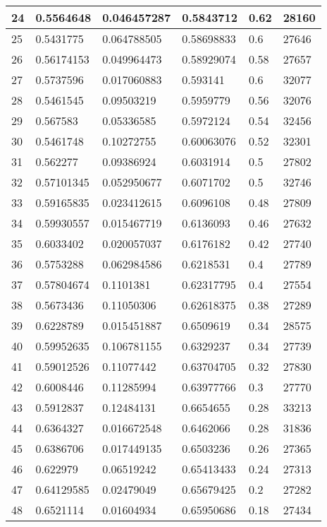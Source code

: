 \begin{longtable}{|l|l|l|l|l|l|}
24 & 0.5564648 & 0.046457287 & 0.5843712 & 0.62 & 28160 \\ \hline 
25 & 0.5431775 & 0.064788505 & 0.58698833 & 0.6 & 27646 \\ \hline 
26 & 0.56174153 & 0.049964473 & 0.58929074 & 0.58 & 27657 \\ \hline 
27 & 0.5737596 & 0.017060883 & 0.593141 & 0.6 & 32077 \\ \hline 
28 & 0.5461545 & 0.09503219 & 0.5959779 & 0.56 & 32076 \\ \hline 
29 & 0.567583 & 0.05336585 & 0.5972124 & 0.54 & 32456 \\ \hline 
30 & 0.5461748 & 0.10272755 & 0.60063076 & 0.52 & 32301 \\ \hline 
31 & 0.562277 & 0.09386924 & 0.6031914 & 0.5 & 27802 \\ \hline 
32 & 0.57101345 & 0.052950677 & 0.6071702 & 0.5 & 32746 \\ \hline 
33 & 0.59165835 & 0.023412615 & 0.6096108 & 0.48 & 27809 \\ \hline 
34 & 0.59930557 & 0.015467719 & 0.6136093 & 0.46 & 27632 \\ \hline 
35 & 0.6033402 & 0.020057037 & 0.6176182 & 0.42 & 27740 \\ \hline 
36 & 0.5753288 & 0.062984586 & 0.6218531 & 0.4 & 27789 \\ \hline 
37 & 0.57804674 & 0.1101381 & 0.62317795 & 0.4 & 27554 \\ \hline 
38 & 0.5673436 & 0.11050306 & 0.62618375 & 0.38 & 27289 \\ \hline 
39 & 0.6228789 & 0.015451887 & 0.6509619 & 0.34 & 28575 \\ \hline 
40 & 0.59952635 & 0.106781155 & 0.6329237 & 0.34 & 27739 \\ \hline 
41 & 0.59012526 & 0.11077442 & 0.63704705 & 0.32 & 27830 \\ \hline 
42 & 0.6008446 & 0.11285994 & 0.63977766 & 0.3 & 27770 \\ \hline 
43 & 0.5912837 & 0.12484131 & 0.6654655 & 0.28 & 33213 \\ \hline 
44 & 0.6364327 & 0.016672548 & 0.6462066 & 0.28 & 31836 \\ \hline 
45 & 0.6386706 & 0.017449135 & 0.6503236 & 0.26 & 27365 \\ \hline 
46 & 0.622979 & 0.06519242 & 0.65413433 & 0.24 & 27313 \\ \hline 
47 & 0.64129585 & 0.02479049 & 0.65679425 & 0.2 & 27282 \\ \hline 
48 & 0.6521114 & 0.01604934 & 0.65950686 & 0.18 & 27434 \\ \hline 

\end{longtable}
